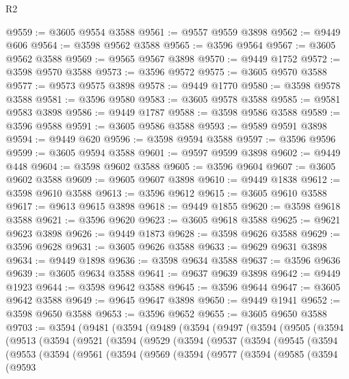 \begin{lexlean}{R2}
\begin{coremodule}
@9559 := @3605 @9554 @3588
@9561 := @9557 @9559 @3898
@9562 := @9449 @606
@9564 := @3598 @9562 @3588
@9565 := @3596 @9564
@9567 := @3605 @9562 @3588
@9569 := @9565 @9567 @3898
@9570 := @9449 @1752
@9572 := @3598 @9570 @3588
@9573 := @3596 @9572
@9575 := @3605 @9570 @3588
@9577 := @9573 @9575 @3898
@9578 := @9449 @1770
@9580 := @3598 @9578 @3588
@9581 := @3596 @9580
@9583 := @3605 @9578 @3588
@9585 := @9581 @9583 @3898
@9586 := @9449 @1787
@9588 := @3598 @9586 @3588
@9589 := @3596 @9588
@9591 := @3605 @9586 @3588
@9593 := @9589 @9591 @3898
@9594 := @9449 @620
@9596 := @3598 @9594 @3588
@9597 := @3596 @9596
@9599 := @3605 @9594 @3588
@9601 := @9597 @9599 @3898
@9602 := @9449 @448
@9604 := @3598 @9602 @3588
@9605 := @3596 @9604
@9607 := @3605 @9602 @3588
@9609 := @9605 @9607 @3898
@9610 := @9449 @1838
@9612 := @3598 @9610 @3588
@9613 := @3596 @9612
@9615 := @3605 @9610 @3588
@9617 := @9613 @9615 @3898
@9618 := @9449 @1855
@9620 := @3598 @9618 @3588
@9621 := @3596 @9620
@9623 := @3605 @9618 @3588
@9625 := @9621 @9623 @3898
@9626 := @9449 @1873
@9628 := @3598 @9626 @3588
@9629 := @3596 @9628
@9631 := @3605 @9626 @3588
@9633 := @9629 @9631 @3898
@9634 := @9449 @1898
@9636 := @3598 @9634 @3588
@9637 := @3596 @9636
@9639 := @3605 @9634 @3588
@9641 := @9637 @9639 @3898
@9642 := @9449 @1923
@9644 := @3598 @9642 @3588
@9645 := @3596 @9644
@9647 := @3605 @9642 @3588
@9649 := @9645 @9647 @3898
@9650 := @9449 @1941
@9652 := @3598 @9650 @3588
@9653 := @3596 @9652
@9655 := @3605 @9650 @3588
@9703 := @3594
    (@9481
      (@3594
        (@9489
          (@3594
            (@9497
              (@3594
                (@9505
                  (@3594
                    (@9513
                      (@3594
                        (@9521
                          (@3594
                            (@9529
                              (@3594
                                (@9537
                                  (@3594
                                    (@9545
                                      (@3594
                                        (@9553
                                          (@3594
                                            (@9561
                                              (@3594
                                                (@9569
                                                  (@3594
                                                    (@9577
                                                      (@3594
                                                        (@9585
                                                          (@3594
                                                            (@9593

\end{coremodule}
\end{lexlean}
